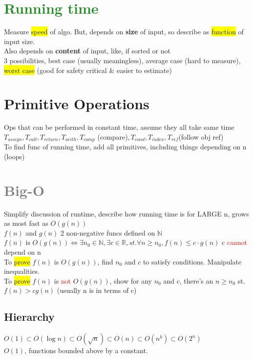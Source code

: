 \section{\textcolor{ForestGreen}{Running time}}
Measure \colorbox{Yellow}{speed} of algo. But, depends on \textbf{size} of input, so describe as \colorbox{Yellow}{function} of input size.
\\ Also depends on \textbf{content} of input, like, if sorted or not
\\ 3 possibilities, best case (usually meaningless), average case (hard to measure), \colorbox{Yellow}{worst case} (good for safety critical \& easier to estimate)
\section{Primitive Operations} Ops that can be performed in constant time, assume they all take same time
\\$T_{assign},T_{call},T_{return},T_{arith},T_{comp}$ (compare)$,T_{cond},T_{index},T_{ref}$(follow obj ref)
\\ To find func of running time, add all primitives, including things depending on n (loops)
\color{Gray}
\section{\textcolor{Gray}{Big-O}} Simplify discussion of runtime, describe how running time is for LARGE n, grows as most fast as $O(g(n))$
\\ $f(n)$ and $g(n)$ 2 non-negative funcs defined on $\mathbb{N}$
	$f(n) \text{ is } O(g(n)) \iff \exists n_0\in \mathbb{N}, \exists c \in \mathbb{R}, st. \forall n\geq n_0, f(n) \leq c\cdot g(n)$
c \textcolor{red}{cannot} depend on n
\\ To \colorbox{Yellow}{prove} $f(n)$ is $O(g(n))$, find $n_0$ and $c$ to satisfy conditions. Manipulate inequalities.
\\ To \colorbox{Yellow}{prove} $f(n)$ is \textcolor{Red}{not} $O(g(n))$, show for any $n_0$ and $c$, there's an $n\geq n_0$ st. $f(n)>c g(n)$ (usually n is in terms of c)
\subsection{Hierarchy}
	$O(1)\subset O(\log{n}) \subset O(\sqrt{n}) \subset O(n) \subset O(n^k) \subset O(2^n)$
	\\$O(1)$, functions bounded above by a constant.
